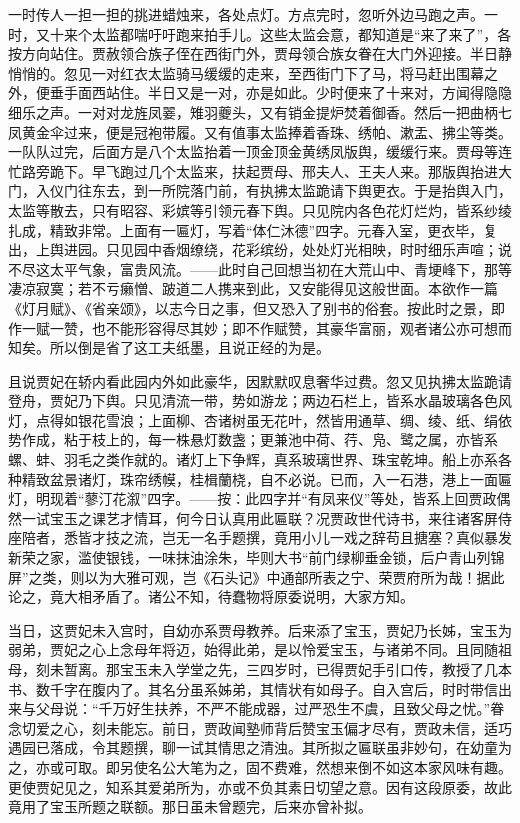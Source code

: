 \documentclass[12pt,oneside]{book}
\begin{document}
一时传人一担一担的挑进蜡烛来，各处点灯。方点完时，忽听外边马跑之声。一时，又十来个太监都喘吁吁跑来拍手儿。这些太监会意，都知道是“来了来了”，各按方向站住。贾赦领合族子侄在西街门外，贾母领合族女眷在大门外迎接。半日静悄悄的。忽见一对红衣太监骑马缓缓的走来，至西街门下了马，将马赶出围幕之外，便垂手面西站住。半日又是一对，亦是如此。少时便来了十来对，方闻得隐隐细乐之声。一对对龙旌凤翣，雉羽夔头，又有销金提炉焚着御香。然后一把曲柄七凤黄金伞过来，便是冠袍带履。又有值事太监捧着香珠、绣帕、漱盂、拂尘等类。一队队过完，后面方是八个太监抬着一顶金顶金黄绣凤版舆，缓缓行来。贾母等连忙路旁跪下。早飞跑过几个太监来，扶起贾母、邢夫人、王夫人来。那版舆抬进大门，入仪门往东去，到一所院落门前，有执拂太监跪请下舆更衣。于是抬舆入门，太监等散去，只有昭容、彩嫔等引领元春下舆。只见院内各色花灯烂灼，皆系纱绫扎成，精致非常。上面有一匾灯，写着“体仁沐德”四字。元春入室，更衣毕，复出，上舆进园。只见园中香烟缭绕，花彩缤纷，处处灯光相映，时时细乐声喧；说不尽这太平气象，富贵风流。——此时自己回想当初在大荒山中、青埂峰下，那等凄凉寂寞；若不亏癞憎、跛道二人携来到此，又安能得见这般世面。本欲作一篇《灯月赋》、《省亲颂》，以志今日之事，但又恐入了别书的俗套。按此时之景，即作一赋一赞，也不能形容得尽其妙；即不作赋赞，其豪华富丽，观者诸公亦可想而知矣。所以倒是省了这工夫纸墨，且说正经的为是。

且说贾妃在轿内看此园内外如此豪华，因默默叹息奢华过费。忽又见执拂太监跪请登舟，贾妃乃下舆。只见清流一带，势如游龙；两边石栏上，皆系水晶玻璃各色风灯，点得如银花雪浪；上面柳、杏诸树虽无花叶，然皆用通草、绸、绫、纸、绢依势作成，粘于枝上的，每一株悬灯数盏；更兼池中荷、荇、凫、鹭之属，亦皆系螺、蚌、羽毛之类作就的。诸灯上下争辉，真系玻璃世界、珠宝乾坤。船上亦系各种精致盆景诸灯，珠帘绣幙，桂楫蘭桡，自不必说。已而，入一石港，港上一面匾灯，明现着“蓼汀花溆”四字。——按：此四字并“有凤来仪”等处，皆系上回贾政偶然一试宝玉之课艺才情耳，何今日认真用此匾联？况贾政世代诗书，来往诸客屏侍座陪者，悉皆才技之流，岂无一名手题撰，竟用小儿一戏之辞苟且搪塞？真似暴发新荣之家，滥使银钱，一味抹油涂朱，毕则大书“前门绿柳垂金锁，后户青山列锦屏”之类，则以为大雅可观，岂《石头记》中通部所表之宁、荣贾府所为哉！据此论之，竟大相矛盾了。诸公不知，待蠢物将原委说明，大家方知。

当日，这贾妃未入宫时，自幼亦系贾母教养。后来添了宝玉，贾妃乃长姊，宝玉为弱弟，贾妃之心上念母年将迈，始得此弟，是以怜爱宝玉，与诸弟不同。且同随祖母，刻未暂离。那宝玉未入学堂之先，三四岁时，已得贾妃手引口传，教授了几本书、数千字在腹内了。其名分虽系姊弟，其情状有如母子。自入宫后，时时带信出来与父母说：“千万好生扶养，不严不能成器，过严恐生不虞，且致父母之忧。”眷念切爱之心，刻未能忘。前日，贾政闻塾师背后赞宝玉偏才尽有，贾政未信，适巧遇园已落成，令其题撰，聊一试其情思之清浊。其所拟之匾联虽非妙句，在幼童为之，亦或可取。即另使名公大笔为之，固不费难，然想来倒不如这本家风味有趣。更使贾妃见之，知系其爱弟所为，亦或不负其素日切望之意。因有这段原委，故此竟用了宝玉所题之联额。那日虽未曾题完，后来亦曾补拟。
\end{document}
